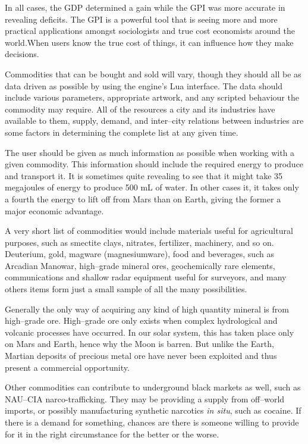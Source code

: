 In all cases, the GDP determined a gain while the GPI was more accurate in revealing deficits. The GPI is a powerful tool that is seeing more and more practical applications amongst sociologists and true cost economists around the world.\footnotecite[costanzaa2004] When users know the true cost of things, it can influence how they make decisions.

Commodities that can be bought and sold will vary, though they should all be as data driven as possible by using the engine's Lua interface. The data should include various parameters, appropriate artwork, and any scripted behaviour the commodity may require. All of the resources a city and its industries have available to them, supply, demand, and inter--city relations between industries are some factors in determining the complete list at any given time.

The user should be given as much information as possible when working with a given commodity. This information should include the required energy to produce and transport it. It is sometimes quite revealing to see that it might take 35 megajoules of energy to produce 500 mL of water. In other cases it, it takes only a fourth the energy to lift off from Mars than on Earth, giving the former a major economic advantage.

A very short list of commodities would include materials useful for agricultural purposes, such as smectite clays, nitrates, fertilizer, machinery, and so on. Deuterium, gold, magware (magnesiumware), food and beverages, such as Arcadian Manowar, high--grade mineral ores, geochemically rare elements, communications and shallow radar equipment useful for surveyors, and many others items form just a small sample of all the many possibilities.

Generally the only way of acquiring any kind of high quantity mineral is from high--grade ore. High--grade ore only exists when complex hydrological and volcanic processes have occurred. In our solar system, this has taken place only on Mars and Earth, hence why the Moon is barren. But unlike the Earth, Martian deposits of precious metal ore have never been exploited and thus present a commercial opportunity.

Other commodities can contribute to underground black markets as well, such as NAU--CIA narco-trafficking. They may be providing a supply from off--world imports, or possibly manufacturing synthetic narcotics {\it in situ}, such as cocaine. If there is a demand for something, chances are there is someone willing to provide for it in the right circumstance for the better or the worse.

